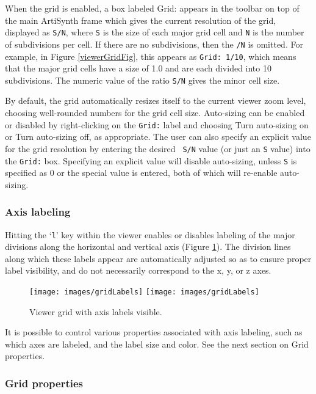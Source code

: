 \documentclass{article}
\begin{document}
When the grid is enabled, a box labeled {\sf Grid:} appears in the
toolbar on top of the main ArtiSynth frame which gives the current
resolution of the grid, displayed as {\tt S/N}, where {\tt S} is the
size of each major grid cell and {\tt N} is the number of subdivisions
per cell. If there are no subdivisions, then the {\tt /N} is omitted.
For example, in Figure \ref{viewerGridFig}, this appears as {\tt Grid:
1/10}, which means that the major grid cells have a size of 1.0 and
are each divided into 10 subdivisions. The numeric value of the ratio
{\tt S/N} gives the minor cell size.

By default, the grid automatically resizes itself to the current
viewer zoom level, choosing well-rounded numbers for the grid cell
size. Auto-sizing can be enabled or disabled by right-clicking on the
{\tt Grid:} label and choosing {\sf Turn auto-sizing on} or {\sf Turn
auto-sizing off}, as appropriate. The user can also specify an
explicit value for the grid resolution by entering the desired {\tt
S/N} value (or just an {\tt S} value) into the {\tt Grid:} box.
Specifying an explicit value will disable auto-sizing, unless {\tt S}
is specified as 0 or the special value {\tt *} is entered, both of
which will re-enable auto-sizing.

\subsubsection{Axis labeling}
\label{AxisLabels}

Hitting the `{\tt l}' key within the viewer enables or disables
labeling of the major divisions along the horizontal and vertical axis
(Figure \ref{gridLabels:fig}). The division lines along which these
labels appear are automatically adjusted so as to ensure proper label
visibility, and do not necessarily correspond to the x, y, or z axes.

\begin{figure}[h]
\begin{center}
\iflatexml
\texttt{[image: images/gridLabels]}
\else
\texttt{[image: images/gridLabels]}
\fi
\end{center}
\caption{Viewer grid with axis labels visible.}%
\label{gridLabels:fig}
\end{figure}

It is possible to control various properties associated with
axis labeling, such as which axes are labeled, and the label size and
color. See the next section on {\sf Grid properties}.

\subsubsection{Grid properties}
\label{GridProperties}
\end{document}

